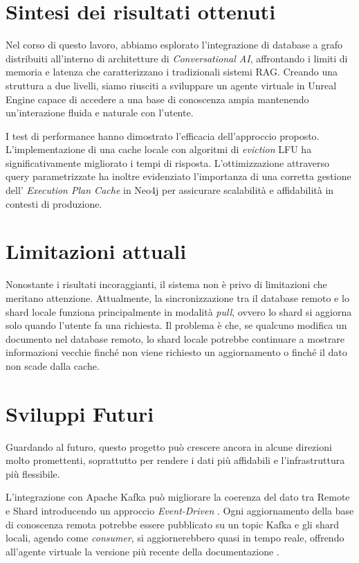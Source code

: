 \newpage\pagestyle{conclusions}


\section*{Sintesi dei risultati ottenuti}
Nel corso di questo lavoro, abbiamo esplorato l'integrazione di database a grafo distribuiti all'interno di architetture di \textit{Conversational AI}, affrontando i limiti di memoria e latenza che caratterizzano i tradizionali sistemi RAG. Creando una struttura a due livelli, siamo riusciti a sviluppare un agente virtuale in Unreal Engine capace di accedere a una base di conoscenza ampia mantenendo un'interazione fluida e naturale con l'utente.

I test di performance hanno dimostrato l'efficacia dell'approccio proposto. L'implementazione di una cache locale con algoritmi di \textit{eviction} LFU ha significativamente migliorato i tempi di risposta. L'ottimizzazione attraverso query parametrizzate ha inoltre evidenziato l'importanza di una corretta gestione dell' \textit{Execution Plan Cache} in Neo4j per assicurare scalabilità e affidabilità in contesti di produzione.

\section*{Limitazioni attuali}
Nonostante i risultati incoraggianti, il sistema non è privo di limitazioni che meritano attenzione. Attualmente, la sincronizzazione tra il database remoto e lo shard locale funziona principalmente in modalità \textit{pull}, ovvero lo shard si aggiorna solo quando l'utente fa una richiesta. Il problema è che, se qualcuno modifica un documento nel database remoto, lo shard locale potrebbe continuare a mostrare informazioni vecchie finché non viene richiesto un aggiornamento o finché il dato non scade dalla cache.

\newpage

\section*{Sviluppi Futuri}
Guardando al futuro, questo progetto può crescere ancora in alcune direzioni molto promettenti, soprattutto per rendere i dati più affidabili e l'infrastruttura più flessibile.

L'integrazione con Apache Kafka può migliorare la coerenza del dato tra Remote e Shard introducendo un approccio \textit{Event-Driven} \cite{shapira2021kafka}. Ogni aggiornamento della base di conoscenza remota potrebbe essere pubblicato su un topic Kafka e gli shard locali, agendo come \textit{consumer}, si aggiornerebbero quasi in tempo reale, offrendo all'agente virtuale la versione più recente della documentazione \cite{apache_kafka}.

